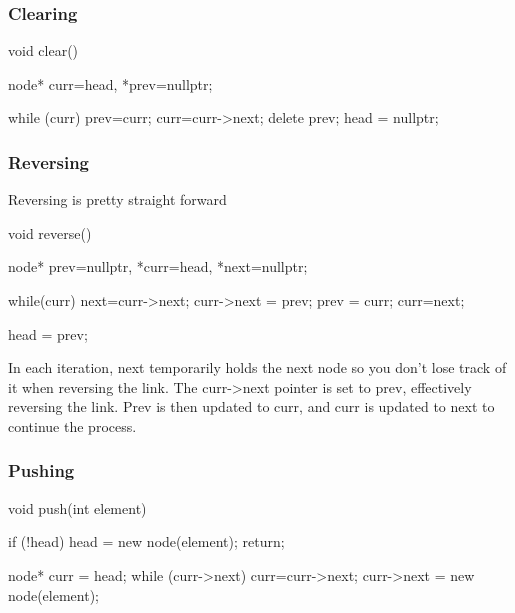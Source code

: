 \documentclass{report}
\begin{document}
    \pagebreak 
    \subsubsection{Clearing}
    \bigbreak \noindent 
    \begin{cppcode}
        void clear() {
            node* curr=head, *prev=nullptr;

            while (curr) {
                prev=curr;
                curr=curr->next;
                delete prev;
            }
            head = nullptr;
        }
    \end{cppcode}

    \pagebreak 
    \subsubsection{Reversing}
    \bigbreak \noindent 
    Reversing is pretty straight forward
    \bigbreak \noindent 
    \begin{cppcode}
        void reverse() {
            node* prev=nullptr, *curr=head, *next=nullptr;

            while(curr) {
                next=curr->next;
                curr->next = prev;
                prev = curr;
                curr=next;
            }

            head = prev;
        }
    \end{cppcode}
    \bigbreak \noindent 
    In each iteration, next temporarily holds the next node so you don’t lose track of it when reversing the link.
    \bigbreak \noindent 
    The curr->next pointer is set to prev, effectively reversing the link.
    \bigbreak \noindent 
    Prev is then updated to curr, and curr is updated to next to continue the process.


    \pagebreak 
    \subsubsection{Pushing}
    \bigbreak \noindent 
    \begin{cppcode}
        void push(int element) {
            if (!head) {
                head = new node(element);
                return;
            }

            node* curr = head;
            while (curr->next) {
                curr=curr->next;
            }
            curr->next = new node(element);
        }
    \end{cppcode}

    \pagebreak 
\end{document}
